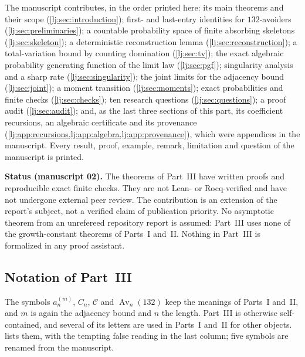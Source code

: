 \documentclass[11pt,a4paper]{article}
\theoremstyle{definition}\newaliascnt{definition}{theorem}
\theoremstyle{remark}\newaliascnt{remark}{theorem}
\newcommand{\Av}{\operatorname{Av}}
\newcommand{\Cat}{\mathcal C}
\begin{document}
The manuscript contributes, in the order printed here: its main theorems and
their scope (\cref{lj:sec:introduction}); first- and last-entry identities
for $132$-avoiders (\cref{lj:sec:preliminaries}); a countable probability
space of finite absorbing skeletons (\cref{lj:sec:skeleton}); a deterministic
reconstruction lemma (\cref{lj:sec:reconstruction}); a total-variation bound
by counting domination (\cref{lj:sec:tv}); the exact algebraic probability
generating function of the limit law (\cref{lj:sec:pgf}); singularity
analysis and a sharp rate (\cref{lj:sec:singularity}); the joint limits for
the adjacency bound (\cref{lj:sec:joint}); a moment transition
(\cref{lj:sec:moments}); exact probabilities and finite checks
(\cref{lj:sec:checks}); ten research questions (\cref{lj:sec:questions}); a
proof audit (\cref{lj:sec:audit}); and, as the last three sections of this
part, its coefficient recursions, an algebraic certificate and its
provenance (\cref{lj:app:recursions,lj:app:algebra,lj:app:provenance}), which
were appendices in the manuscript. Every result, proof, example, remark,
limitation and question of the manuscript is printed.

\begin{resultbox}
\textbf{Status (manuscript 02).} The theorems of Part~III have written
proofs and reproducible exact finite checks. They are not Lean- or
Rocq-verified and have not undergone external peer review. The contribution
is an extension of the report's subject, not a verified claim of publication
priority. No asymptotic theorem from an unrefereed repository report is
assumed: Part~III uses none of the growth-constant theorems of Parts~I
and~II. Nothing in Part~III is formalized in any proof assistant.
\end{resultbox}

\subsection{Notation of Part~III}
\label{lj:sec:notation}
The symbols $a_n^{(m)}$, $C_n$, $\Cat$ and $\Av_n(132)$ keep the meanings
of Parts~I and~II, and $m$ is again the adjacency bound and $n$ the length.
Part~III is otherwise self-contained, and several of its letters are used in
Parts~I and~II for other objects.  lists them, with the
tempting false reading in the last column; five symbols are renamed from the
manuscript.
\end{document}
